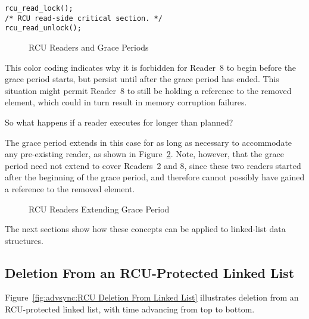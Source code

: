 \vspace{5pt}
\begin{minipage}[t]{\columnwidth}
\begin{verbatim}
rcu_read_lock();
/* RCU read-side critical section. */
rcu_read_unlock();
\end{verbatim}
\end{minipage}
\vspace{5pt}

\begin{figure}[htb]
\centering
{}
\caption{RCU Readers and Grace Periods}
\label{fig:advsync:RCU Readers and Grace Periods}
\end{figure}

This color coding indicates why it is forbidden for Reader~8 to
begin before the grace period starts, but persist until after the
grace period has ended.
This situation might permit Reader~8 to still be holding a reference
to the removed element, which could in turn result in memory corruption
failures.

So what happens if a reader executes for longer than planned?

The grace period extends in this case for as long as necessary to
accommodate any pre-existing reader, as shown in
Figure~\ref{fig:advsync:RCU Readers Extending Grace Periods}.
Note, however, that the grace period need not extend to cover Readers~2
and 8, since these two readers started after the beginning of the
grace period, and therefore cannot possibly have gained a reference
to the removed element.

\begin{figure}[htb]
\centering
{}
\caption{RCU Readers Extending Grace Period}
\label{fig:advsync:RCU Readers Extending Grace Periods}
\end{figure}

The next sections show how these concepts can be applied to linked-list
data structures.

\subsection{Deletion From an RCU-Protected Linked List}
\label{sec:advsync:Deletion From an RCU-Protected Linked List}

Figure~\ref{fig:advsync:RCU Deletion From Linked List}
illustrates deletion from an RCU-protected linked list,
with time advancing from top to bottom.


